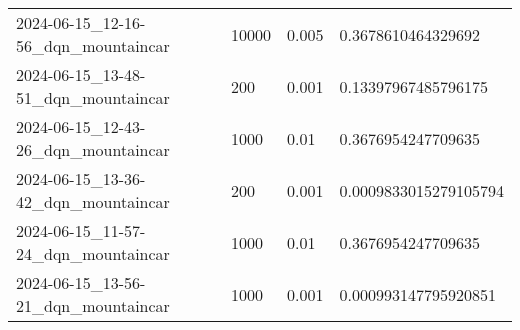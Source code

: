 \documentclass[a4paper,12pt]{article}
\begin{document}
\begin{center}
{\begin{tabular}{llll}
            2024-06-15\_12-16-56\_dqn\_mountaincar & 10000         & 0.005          & 0.3678610464329692    \\
            2024-06-15\_13-48-51\_dqn\_mountaincar & 200           & 0.001          & 0.13397967485796175   \\
            2024-06-15\_12-43-26\_dqn\_mountaincar & 1000          & 0.01           & 0.3676954247709635    \\
            2024-06-15\_13-36-42\_dqn\_mountaincar & 200           & 0.001          & 0.0009833015279105794 \\
            2024-06-15\_11-57-24\_dqn\_mountaincar & 1000          & 0.01           & 0.3676954247709635    \\
            2024-06-15\_13-56-21\_dqn\_mountaincar & 1000          & 0.001          & 0.000993147795920851  \\
        \end{tabular}
    }
\end{center}
\end{document}
